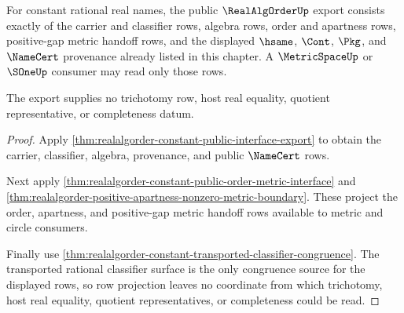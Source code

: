 \begin{theorem}
\label{thm:realalgorder-public-apartness-metric-export}
For constant rational real names, the public $\RealAlgOrderUp$ export consists
exactly of the carrier and classifier rows, algebra rows, order and apartness
rows, positive-gap metric handoff rows, and the displayed $\hsame$, $\Cont$,
$\Pkg$, and $\NameCert$ provenance already listed in this chapter. A
$\MetricSpaceUp$ or $\SOneUp$ consumer may read only those rows.

The export supplies no trichotomy row, host real equality, quotient
representative, or completeness datum.
\end{theorem}
\begin{proof}
Apply \autoref{thm:realalgorder-constant-public-interface-export} to obtain the
carrier, classifier, algebra, provenance, and public $\NameCert$ rows.

Next apply \autoref{thm:realalgorder-constant-public-order-metric-interface} and
\autoref{thm:realalgorder-positive-apartness-nonzero-metric-boundary}. These
project the order, apartness, and positive-gap metric handoff rows available to
metric and circle consumers.

Finally use
\autoref{thm:realalgorder-constant-transported-classifier-congruence}. The
transported rational classifier surface is the only congruence source for the
displayed rows, so row projection leaves no coordinate from which trichotomy,
host real equality, quotient representatives, or completeness could be read.
\end{proof}

